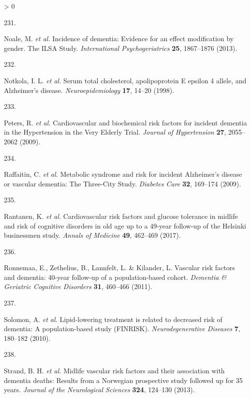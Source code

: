 \documentclass[a4paper, twoside]{templates/ociamthesis}
\newlength{\cslhangindent}
\newlength{\csllabelwidth}
\newenvironment{CSLReferences}[3] %
 {%
  \setlength{\parindent}{0pt}
  \ifodd #1 \everypar{\setlength{\hangindent}{\cslhangindent}}\ignorespaces\fi
  \ifnum #2 > 0
  \setlength{\parskip}{#2\baselineskip}
  \fi
 }%
 {}
\newcommand{\CSLLeftMargin}[1]{\parbox[t]{\maxof{\widthof{#1}}{\csllabelwidth}}{#1}}
\newcommand{\CSLRightInline}[1]{\parbox[t]{\linewidth - \csllabelwidth}{#1}}
\begin{document}
\begin{CSLReferences}{0}{0}
\leavevmode\hypertarget{ref-noale2013}{}%
\CSLLeftMargin{231. }
\CSLRightInline{Noale, M. \emph{et al.} Incidence of dementia: Evidence for an effect modification by gender. {The ILSA Study}. \emph{International Psychogeriatrics} \textbf{25}, 1867--1876 (2013).}

\leavevmode\hypertarget{ref-notkola1998}{}%
\CSLLeftMargin{232. }
\CSLRightInline{Notkola, I. L. \emph{et al.} Serum total cholesterol, apolipoprotein {E} epsilon 4 allele, and {Alzheimer}'s disease. \emph{Neuroepidemiology} \textbf{17}, 14--20 (1998).}

\leavevmode\hypertarget{ref-peters2009}{}%
\CSLLeftMargin{233. }
\CSLRightInline{Peters, R. \emph{et al.} Cardiovascular and biochemical risk factors for incident dementia in the {Hypertension} in the {Very Elderly Trial}. \emph{Journal of Hypertension} \textbf{27}, 2055--2062 (2009).}

\leavevmode\hypertarget{ref-raffaitin2009}{}%
\CSLLeftMargin{234. }
\CSLRightInline{Raffaitin, C. \emph{et al.} Metabolic syndrome and risk for incident {Alzheimer}'s disease or vascular dementia: The {Three}-{City Study}. \emph{Diabetes Care} \textbf{32}, 169--174 (2009).}

\leavevmode\hypertarget{ref-rantanen2017}{}%
\CSLLeftMargin{235. }
\CSLRightInline{Rantanen, K. \emph{et al.} Cardiovascular risk factors and glucose tolerance in midlife and risk of cognitive disorders in old age up to a 49-year follow-up of the {Helsinki} businessmen study. \emph{Annals of Medicine} \textbf{49}, 462--469 (2017).}

\leavevmode\hypertarget{ref-ronnemaa2011}{}%
\CSLLeftMargin{236. }
\CSLRightInline{Ronnemaa, E., Zethelius, B., Lannfelt, L. \& Kilander, L. Vascular risk factors and dementia: 40-year follow-up of a population-based cohort. \emph{Dementia \& Geriatric Cognitive Disorders} \textbf{31}, 460--466 (2011).}

\leavevmode\hypertarget{ref-solomon2010}{}%
\CSLLeftMargin{237. }
\CSLRightInline{Solomon, A. \emph{et al.} Lipid-lowering treatment is related to decreased risk of dementia: A population-based study ({FINRISK}). \emph{Neurodegenerative Diseases} \textbf{7}, 180--182 (2010).}

\leavevmode\hypertarget{ref-strand2013}{}%
\CSLLeftMargin{238. }
\CSLRightInline{Strand, B. H. \emph{et al.} Midlife vascular risk factors and their association with dementia deaths: Results from a {Norwegian} prospective study followed up for 35 years. \emph{Journal of the Neurological Sciences} \textbf{324}, 124--130 (2013).}


\end{CSLReferences}
\end{document}
